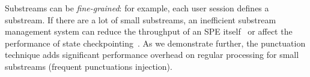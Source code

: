 Substreams can be {\em fine-grained}: for example, each user session defines a substream. If there are a lot of small substreams, an inefficient substream management system can reduce the throughput of an SPE itself~\cite{Li:2008:OPN:1453856.1453890} or affect the performance of state checkpointing~\cite{zhang2021research}. As we demonstrate further, the punctuation technique adds significant performance overhead on regular processing for small substreams (frequent punctuations injection).